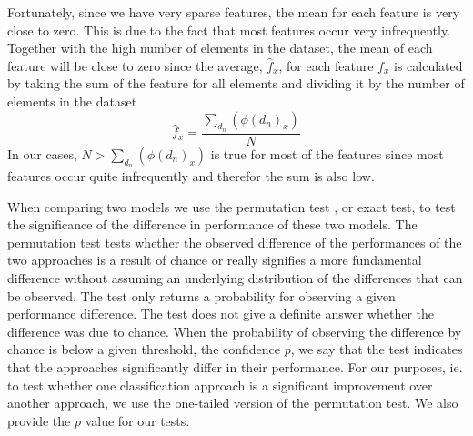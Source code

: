 
Fortunately, since we have very sparse features, the mean for each feature is very close to zero.
This is due to the fact that most features occur very infrequently. Together with the high number of elements in the dataset, the mean of each feature will be close to zero since the average, $\hat{f}_x$, for each feature $f_x$ is calculated by taking the sum of the feature for all elements and dividing it by the number of elements in the dataset
\begin{equation*}
\hat{f}_x = \frac{\sum_{d_n} (\phi(d_n)_x)}{N}
\end{equation*}
In our cases, $N > \sum_{d_n} (\phi(d_n)_x)$ is true for most of the features since most features occur quite infrequently and therefor the sum is also low.

When comparing two models we use the permutation test \cite{Fisher1925}, or exact test, to test the significance of the difference in performance of these two models.
The permutation test tests whether the observed difference of the performances of the two approaches is a result of chance or really signifies a more fundamental difference without assuming an underlying distribution of the differences that can be observed.
The test only returns a probability for observing a given performance difference. The test does not give a definite answer whether the difference was due to chance.
When the probability of observing the difference by chance is below a given threshold, the confidence $p$, we say that the test indicates that the approaches significantly differ in their performance.
For our purposes, ie. to test whether one classification approach is a significant improvement over another approach, we use the one-tailed version \cite{Kock2015} of the permutation test.
We also provide the $p$ value for our tests.

